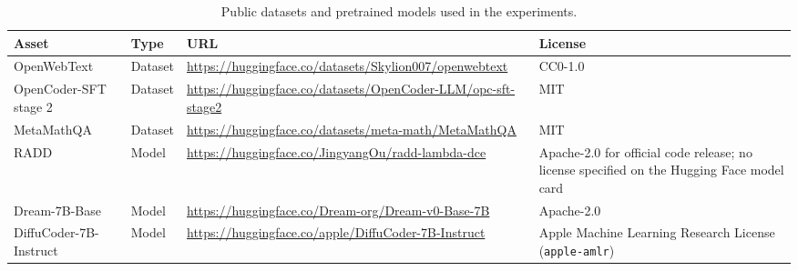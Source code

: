 \begin{table}[h]
\centering
\caption{Public datasets and pretrained models used in the experiments.}
\setlength{\tabcolsep}{4pt}
\small
\begin{tabularx}{\textwidth}{p{}p{}X p{}}
\toprule
Asset & Type & URL & License \\
\midrule
OpenWebText & Dataset & \url{https://huggingface.co/datasets/Skylion007/openwebtext} & CC0-1.0 \\
OpenCoder-SFT stage 2 & Dataset & \url{https://huggingface.co/datasets/OpenCoder-LLM/opc-sft-stage2} & MIT \\
MetaMathQA & Dataset & \url{https://huggingface.co/datasets/meta-math/MetaMathQA} & MIT \\
RADD & Model & \url{https://huggingface.co/JingyangOu/radd-lambda-dce} & Apache-2.0 for official code release; no license specified on the Hugging Face model card \\
Dream-7B-Base & Model & \url{https://huggingface.co/Dream-org/Dream-v0-Base-7B} & Apache-2.0 \\
DiffuCoder-7B-Instruct & Model & \url{https://huggingface.co/apple/DiffuCoder-7B-Instruct} & Apple Machine Learning Research License (\texttt{apple-amlr}) \\
\bottomrule
\end{tabularx}
\label{tab:asset-licenses}
\end{table}
